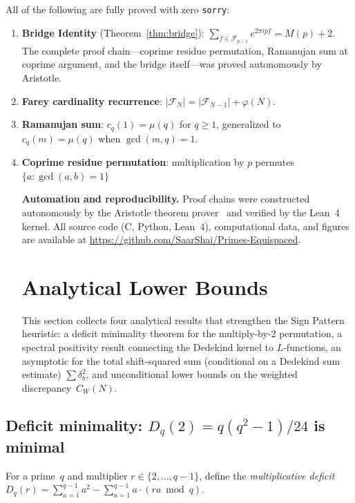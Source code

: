 \documentclass[11pt]{article}
\theoremstyle{definition}
\newcommand{\F}{\mathcal{F}}
\begin{document}
All of the following are fully proved with zero \texttt{sorry}:
\begin{enumerate}
  \item \textbf{Bridge Identity} (Theorem~\ref{thm:bridge}):
    $\sum_{f \in \F_{p-1}} e^{2\pi ipf} = M(p) + 2$.
    The complete proof chain---coprime residue permutation,
    Ramanujan sum at coprime argument, and the bridge
    itself---was proved autonomously by Aristotle.
  \item \textbf{Farey cardinality recurrence}:
    $|\F_N| = |\F_{N-1}| + \varphi(N)$.
  \item \textbf{Ramanujan sum}: $c_q(1) = \mu(q)$ for $q \ge 1$,
    generalized to $c_q(m) = \mu(q)$ when $\gcd(m,q) = 1$.
  \item \textbf{Coprime residue permutation}:
    multiplication by $p$ permutes $\{a : \gcd(a,b) = 1\}$



\smallskip\noindent
\textbf{Automation and reproducibility.}\quad
Proof chains were constructed autonomously by the
Aristotle theorem prover~\cite{Aristotle2025} and verified
by the Lean~4 kernel.
All source code (C, Python, Lean~4), computational data,
and figures are available at
\url{https://github.com/SaarShai/Primes-Equispaced}.

\section{Analytical Lower Bounds}\label{sec:lower-bounds}

This section collects four analytical results that strengthen
the Sign Pattern heuristic: a deficit minimality theorem for the
multiply-by-$2$ permutation, a spectral positivity result
connecting the Dedekind kernel to $L$-functions, an
asymptotic for the total shift-squared sum (conditional on a Dedekind sum estimate)
$\sum\delta_b^2$, and unconditional lower bounds on the
weighted discrepancy~$C_W(N)$.

\end{enumerate}

\subsection{Deficit minimality: $D_q(2) = q(q^2-1)/24$ is minimal}

For a prime~$q$ and multiplier $r \in \{2, \ldots, q-1\}$,
define the \emph{multiplicative deficit}
$D_q(r) = \sum_{a=1}^{q-1} a^2 - \sum_{a=1}^{q-1}
a \cdot (ra \bmod q)$.
\end{document}
